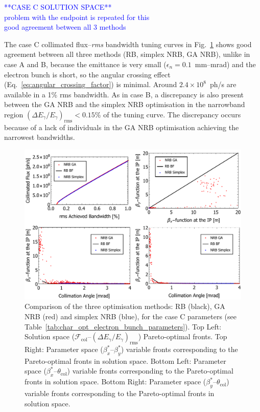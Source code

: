 \documentclass[../main.tex]{subfiles}
\begin{document}
\textcolor{blue}{**CASE C SOLUTION SPACE** \\ problem with the endpoint is repeated for this \\ good agreement between all 3 methods}

The case C collimated flux--\textit{rms} bandwidth tuning curves in Fig.~\ref{fig:case_C_optimisation_comparision} shows good agreement between all three methods (RB, simplex NRB, GA NRB), unlike in case A and B, because the emittance is very small ($\epsilon_{n} = 0.1$~\si{\milli\meter}--\si{\milli\radian}) and the electron bunch is short, so the angular crossing effect (Eq.~\ref{eq:angular_crossing_factor}) is minimal. Around $2.4\times 10^{8}$~ph/\si{\second} are available in a 1\% rms bandwidth. As in case B, a discrepancy is also present between the GA NRB and the simplex NRB optimisation in the narrowband region $\left(\Delta E_{\gamma}/E_{\gamma}\right)_{\mathrm{rms}} < 0.15$\% of the tuning curve. The discrepancy occurs because of a lack of individuals in the GA NRB optimisation achieving the narrowest bandwidths.       

\begin{figure}[!h]
\centering
\includegraphics[width=\textwidth]{Figures/Optimisation_and_Characterisation_of_Inverse_Compton_Scattering_Sources/CaseCoptcomp.pdf}
\caption{Comparison of the three optimisation methods: RB (black), GA NRB (red) and simplex NRB (blue), for the case C parameters (see Table~\ref{tab:char_opt_electron_bunch_parameters}). Top Left: Solution space ($\mathcal{F}_{\mathrm{col}}$--$\left(\Delta E_{\gamma}/E_{\gamma}\right)_{\mathrm{rms}}$) Pareto-optimal fronts. Top Right: Parameter space ($\beta_{x}^{*}$--$\beta_{y}^{*}$) variable fronts corresponding to the Pareto-optimal fronts in solution space. Bottom Left: Parameter space ($\beta_{x}^{*}$--$\theta_{\mathrm{col}}$) variable fronts corresponding to the Pareto-optimal fronts in solution space. Bottom Right: Parameter space ($\beta_{y}^{*}$--$\theta_{\mathrm{col}}$) variable fronts corresponding to the Pareto-optimal fronts in solution space.}
\label{fig:case_C_optimisation_comparision}
\end{figure}
\end{document}
